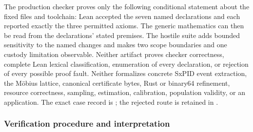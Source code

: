 \documentclass[11pt]{article}
\theoremstyle{definition}
\begin{document}
The production checker proves only the following conditional statement about the fixed files and
toolchain: Lean accepted the seven named declarations and each reported exactly the three permitted
axioms.  The generic mathematics can then be read from the declarations' stated premises.  The
hostile suite adds bounded sensitivity to the named changes and makes two scope boundaries and one
custody limitation observable.  Neither artifact proves checker correctness, complete Lean lexical
classification, enumeration of every declaration, or rejection of every possible proof fault.
Neither formalizes concrete SxPID event extraction, the M\"obius lattice, canonical certificate
bytes, Rust or binary64 refinement, resource correctness, sampling, estimation, calibration,
population validity, or an application.  The exact case record is
; the rejected route is retained in
.

\subsubsection{Verification procedure and interpretation}
\end{document}

